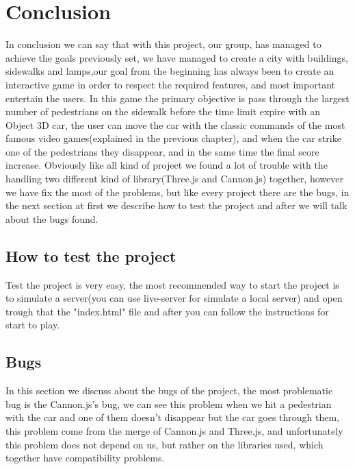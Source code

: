 \documentclass[a4paper, 11pt, titlepage]{report}
\begin{document}
\chapter{Conclusion}
	In conclusion we can say that with this project, our group, has managed to achieve the goals previously set, we have managed to create a city with buildings, sidewalks and lamps,our goal from the beginning has always been to create an interactive game in order to respect the required features, and most important entertain the users.
	In this game the primary objective is pass through the largest number of pedestrians on the sidewalk before the time limit expire with an Object 3D car, the user can move the car with the classic commands of the most famous video games(explained in the previous chapter), and when the car strike one of the pedestrians they disappear, and in the same time the final score increase. 
	Obviously like all kind of project we found a lot of trouble with the handling two different kind of library(Three.js and Cannon.js) together, however we have fix the most of the problems, but like every project there are the bugs, in the next section at first we describe how to test the project and after we will talk about the bugs found.  
	 \section{How to test the project}
	    Test the project is very easy, the most recommended way to start the project is to simulate a server(you can use live-server for simulate a local server) and open trough that the "index.html"  file and after you can follow the instructions for start to play.
	 \section{Bugs}
    	In this section we discuss about the bugs of the project, the most problematic bug is the Cannon.js's bug, we can see this problem when we hit a pedestrian with the car and one of them doesn't disappear but the car goes through them, this problem come from the merge of Cannon.js and Three.js, and unfortunately this problem does not depend on us, but rather on the libraries used, which together have compatibility problems.

\begin{thebibliography}{999}
\end{thebibliography}
\end{document}
